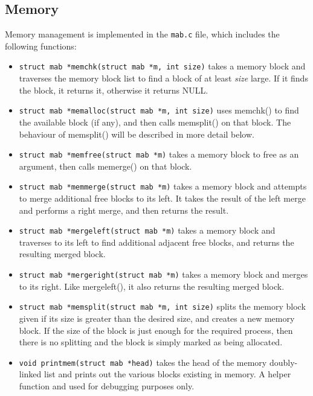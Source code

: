 \documentclass[12pt]{article}
\begin{document}
\subsection{Memory}
Memory management is implemented in the \texttt{mab.c} file, which includes
the following functions:
\begin{itemize}
\item \texttt{struct mab *memchk(struct mab *m, int size)} takes a memory
block and traverses the memory block list to find a block of at least
\textit{size} large. If it finds the block, it returns it, otherwise it returns
NULL.
\item \texttt{struct mab *memalloc(struct mab *m, int size)} uses memchk() to
find the available block (if any), and then calls memsplit() on that block.
The behaviour of memsplit() will be described in more detail below.
\item \texttt{struct mab *memfree(struct mab *m)} takes a memory block to free
as an argument, then calls memerge() on that block.
\item \texttt{struct mab *memmerge(struct mab *m)} takes a memory block and
attempts to merge additional free blocks to its left. It takes the result of
the left merge and performs a right merge, and then returns the result.
\item \texttt{struct mab *mergeleft(struct mab *m)} takes a memory block and
traverses to its left to find additional adjacent free blocks, and returns
the resulting merged block.
\item \texttt{struct mab *mergeright(struct mab *m)} takes a memory block and 
merges to its right. Like mergeleft(), it also returns the resulting merged
block.
\item \texttt{struct mab *memsplit(struct mab *m, int size)} splits the memory
block given if its size is greater than the desired size, and creates a new
memory block. If the size of the block is just enough for the required process,
then there is no splitting and the block is simply marked as being allocated.
\item \texttt{void printmem(struct mab *head)} takes the head of the memory
doubly-linked list and prints out the various blocks existing in memory. A
helper function and used for debugging purposes only.
\end{itemize}
\end{document}
